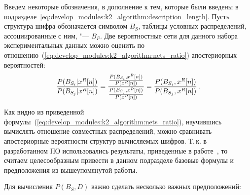 Введем некоторые обозначения, в дополнение к тем, которые были введены в подразделе~\ref{eq:develop_modules:k2_algorithm:description_length}.
Пусть структура шифра обозначается символом $B_S$, таблицы условных распределений, ассоциированные с ним, "--- $B_P$.
\newpage
Две вероятностные сети для данного набора экспериментальных данных можно оценить по отношению~(\ref{eq:develop_modules:k2_algorithm:nets_ratio}) апостериорных вероятностей:
\begin{equation}
  \label{eq:develop_modules:k2_algorithm:nets_ratio}
  \frac{P(B_{S_i} | x^R[n])}{P(B_{S_j} | x^R[n])} =
    \frac{ \frac{P(B_{S_i}, x^R[n])}{P(x^R[n])} }
         { \frac{P(B_{S_j}, x^R[n])}{P(x^R[n])} } =
    \frac{ P(B_{S_i}, x^R[n]) }
         { P(B_{S_j}, x^R[n]) } \text{\,.}
\end{equation}

Как видно из приведенной формулы~(\ref{eq:develop_modules:k2_algorithm:nets_ratio}), научившись вычислять отношение совместных распределений, можно сравнивать апостериорные вероятности структур вычисляемых шифров.
Т.\,к. в разработанном ПО использовались результаты, приведенные в работе~\cite{Cooper1991}, то считаем целесообразным привести в данном подразделе базовые формулы и предположения из вышеупомянутой работы.

Для вычисления $P(B_S, D)$ важно сделать несколько важных предположений:

